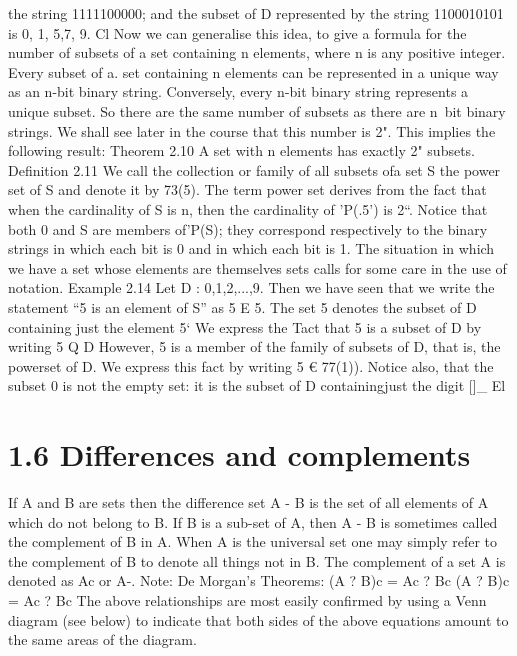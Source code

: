 {{%
the string 1111100000; and the subset of D represented by the string 1100010101 is {0, 1, 5,7, 9}.
Cl
Now we can generalise this idea, to give a formula for the number of subsets of a set containing
n elements, where n is any positive integer. Every subset of a. set containing n elements can
be represented in a unique way as an n-bit binary string. Conversely, every n-bit binary string
represents a unique subset. So there are the same number of subsets as there are n~bit binary
strings. We shall see later in the course that this number is 2". This implies the following result:
Theorem 2.10 A set with n elements has exactly 2" subsets.
Deﬁnition 2.11 We call the collection or family of all subsets ofa set S the power set of S and
denote it by 73(5).
The term power set derives from the fact that when the cardinality of S is n, then the cardinality
of ’P(.5') is 2“. Notice that both 0 and S are members of'P(S); they correspond respectively to the
binary strings in which each bit is 0 and in which each bit is 1.
The situation in which we have a set whose elements are themselves sets calls for some care in the
use of notation.
Example 2.14 Let D : {0,1,2,...,9}. Then we have seen that we write the statement “5 is an
element of S” as
5 E 5.
The set {5} denotes the subset of D containing just the element 5‘ We express the Tact that {5}
is a subset of D by writing
{5} Q D
However, {5} is a member of the family of subsets of D, that is, the powerset of D. We express
this fact by writing
{5} € 77(1)).
Notice also, that the subset {0} is not the empty set: it is the subset of D containingjust the digit
[]_ El


\section{1.6 Differences and complements}
If A and B are sets then the difference set A - B is the set of all elements
of A which do not belong to B.
If B is a sub-set of A, then A - B is sometimes called the complement of
B in A. When A is the universal set one may simply refer to the
complement of B to denote all things not in B. The complement of a set A
is denoted as Ac or A-.
Note: De Morgan’s Theorems:
(A ? B)c = Ac ? Bc
(A ? B)c = Ac ? Bc
The above relationships are most easily confirmed by using a Venn
diagram (see below) to indicate that both sides of the above equations
amount to the same areas of the diagram.

}}
